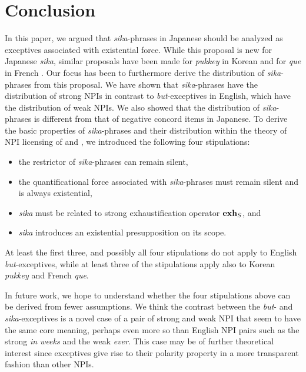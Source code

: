\documentclass[output=paper,colorlinks,citecolor=brown,
]{langscibook}
\def\exh{\ifmmode\mathop{\textbf{exh}}\else\textbf{exh}\xspace\fi}
\begin{document}
\section{Conclusion}

In this paper, we argued that \emph{sika}-phrases in Japanese should be analyzed as exceptives associated with existential force.  While this proposal is new for Japanese \emph{sika}, similar proposals have been made for \emph{pukkey} in Korean \citep{sells01a} and for \emph{que} in French \citep{fintel07a}.  Our focus has been to furthermore derive the distribution of \emph{sika}-phrases from this proposal.  We have shown that \emph{sika}-phrases have the distribution of strong NPIs in contrast to \emph{but}-exceptives in English, which have the distribution of weak NPIs.  We also showed that the distribution of \emph{sika}-phrases is different from that of negative concord items in Japanese.   To derive the basic properties of \emph{sika}-phrases and their distribution within the theory of NPI licensing of \cite{gajewski11a} and \cite{chierchia13a}, we introduced the following four stipulations:

\begin{itemize}
    \item the restrictor of \emph{sika}-phrases can remain silent, 
    \item the quantificational force associated with \emph{sika}-phrases must remain silent and is always existential,
    \item \emph{sika} must be related to strong exhaustification operator $\exh_S$, and
    \item \emph{sika} introduces an existential presupposition on its scope.
\end{itemize}

At least the first three, and possibly all four stipulations do not apply to English \emph{but}-exceptives, while at least three of the stipulations apply also to Korean \emph{pukkey} and French \emph{que}.  

In future work, we hope to understand whether the four stipulations above can be derived from fewer assumptions.
We think the contrast between the \emph{but}- and \emph{sika}-exceptives is a novel case of a pair of strong and weak NPI that seem to have the same core meaning, perhaps even more so than English NPI pairs such as the strong \emph{in weeks} and the weak \emph{ever}. This case may be of further theoretical interest since exceptives  give rise to their polarity property in a more transparent fashion than other NPIs.
\end{document}
